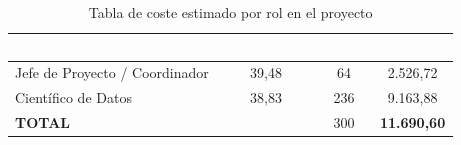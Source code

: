 \begin{table}[htp]
	\centering
	\renewcommand{\arraystretch}{1.3}
		\begin{tabular}{ | l | c | c | c |}
			\hline
			\rowcolor[HTML]{5B9BD5} 
			\textcolor{white}{\textbf{Rol}} & \textcolor{white}{\textbf{Tarifa (\euro{}/h)}} & \textcolor{white}{\textbf{Horas}} & \textcolor{white}{\textbf{Coste (\euro{})}} \\
			\hline
			
			Jefe de Proyecto / Coordinador & 39,48  & 64 & 2.526,72 \\
			\hline
			Científico de Datos & 38,83  & 236 & 9.163,88 \\
			\hline
			\textbf{TOTAL} & \hrulefill & 300 & \textbf{11.690,60} \\
			\hline
			
		\end{tabular} 
		
		\caption{Tabla de coste estimado por rol en el proyecto}
	\end{table}